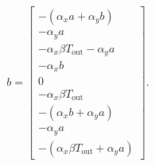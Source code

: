 \documentclass{article}
\begin{document}
\[
b = \begin{bmatrix}
	-(\alpha_x a + \alpha_y b) \\
	-\alpha_y a \\
	-\alpha_x \beta T_{\text{out}} - \alpha_y a \\
	-\alpha_x b \\
	0 \\
	-\alpha_x \beta T_{\text{out}} \\
	-(\alpha_x b + \alpha_y a) \\
	-\alpha_y a \\
	-(\alpha_x \beta T_{\text{out}} + \alpha_y a)
\end{bmatrix}.
\]
\end{document}

